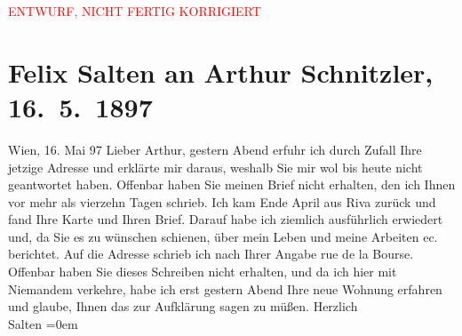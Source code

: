 
\begin{center}
            \textcolor{red}{ENTWURF, NICHT FERTIG KORRIGIERT}
                      \end{center}
            
         \renewcommand{\erwaehnteOrte}{Orte: Paris, Riva del Garda, Wien, rue de la Bourse}
         \renewcommand{\erwaehnteWerke}{}
               \section[Felix Salten an Arthur Schnitzler, 16. 5. 1897]{ Felix Salten an Arthur Schnitzler, 16. 5. 1897}\nopagebreak{}\rehead{ }\begin{ledgroupsized}[t]{13cm}\normalsize\beginnumbering \toendnotes[C]{\smallbreak\pagebreak[2]} 
\pstart
           \raggedleft{}{\pb}Wien, 16. Mai 97\pend
           \pstart
           Lieber Arthur, gestern Abend erfuhr ich durch Zufall Ihre jetzige
               Adresse und erklärte mir daraus, weshalb Sie mir wol bis heute nicht geantwortet
               haben. Offenbar haben Sie meinen Brief nicht erhalten, den ich Ihnen vor mehr als
               vierzehn Tagen schrieb. Ich kam Ende April aus Riva
               zurück und fand Ihre Karte und Ihren Brief. Darauf habe ich ziemlich ausführlich
               erwiedert und, da Sie es zu wünschen schienen, über mein Leben und meine Arbeiten ec.
               berichtet. Auf die Adresse schrieb ich nach Ihrer Angabe rue
                  de la Bourse. Offenbar haben Sie dieses Schreiben nicht erhalten, und da ich
               hier mit Niemandem verkehre, habe ich erst gestern Abend Ihre neue Wohnung erfahren
               und glaube, Ihnen das zur Aufklärung sagen zu müßen.\pend
           \pstart
           Herzlich {\\[\baselineskip]}\spacefill\mbox{Salten}\pend
           \leftskip=0em{}
         
         \endnumbering{}\end{ledgroupsized}\begin{anhang}\end{anhang}\newcommand{\dateiname}{L03265}\newcommand{\titel}{Felix Salten an Arthur Schnitzler, 16. 5. 1897}\newcommand{\editorInnen}{Martin Anton Müller und Laura Untner}
      